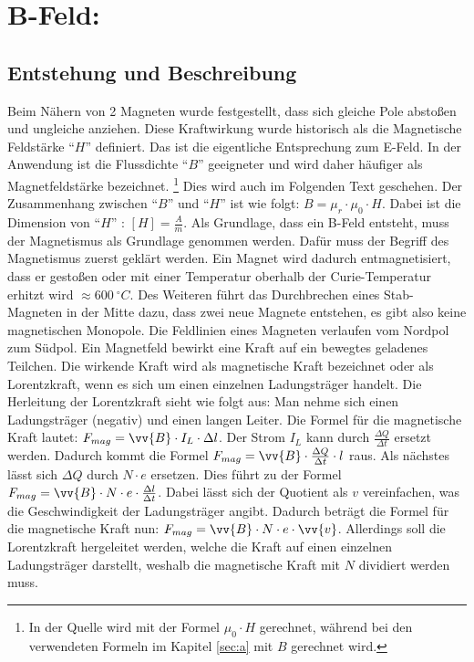 \section{B-Feld:}
\subsection{Entstehung und Beschreibung}
Beim Nähern von 2 Magneten wurde festgestellt, dass sich gleiche Pole abstoßen und ungleiche anziehen.
Diese Kraftwirkung wurde historisch als die Magnetische Feldstärke "`$H$"' definiert.
Das ist die eigentliche Entsprechung zum E-Feld.
In der Anwendung ist die Flussdichte "`$B$"' geeigneter und wird daher häufiger als Magnetfeldstärke bezeichnet. \footnote{In der Quelle \cite{Gente1950} wird mit der Formel $\mu_0 \cdot H$ gerechnet, während bei den verwendeten Formeln im Kapitel \ref{sec:a} mit $B$ gerechnet wird.}
Dies wird auch im Folgenden Text geschehen.
Der Zusammenhang zwischen "`$B$"' und "`$H$"' ist wie folgt: $B = \mu_r \cdot \mu_0 \cdot H$.
Dabei ist die Dimension von "`$H$"' : $[H] = \frac{A}{m}$.
Als Grundlage, dass ein B-Feld entsteht, muss der Magnetismus als Grundlage genommen werden.
Dafür muss der Begriff des Magnetismus zuerst geklärt werden.
Ein Magnet wird dadurch entmagnetisiert, dass er gestoßen oder mit einer Temperatur oberhalb der Curie-Temperatur erhitzt wird $ \approx 600 ~ ^\circ C$.
Des Weiteren führt das Durchbrechen eines Stab-Magneten in der Mitte dazu, dass zwei neue Magnete entstehen, es gibt also keine magnetischen Monopole.
Die Feldlinien eines Magneten verlaufen vom Nordpol zum Südpol.
Ein Magnetfeld bewirkt eine Kraft auf ein bewegtes geladenes Teilchen.
Die wirkende Kraft wird als magnetische Kraft bezeichnet oder als Lorentzkraft, wenn es sich um einen einzelnen Ladungsträger handelt.
Die Herleitung der Lorentzkraft sieht wie folgt aus:
Man nehme sich einen Ladungsträger (negativ) und einen langen Leiter.
Die Formel für die magnetische Kraft lautet: $F_{mag} = \vv{B} \cdot I_L \cdot \Delta l$.
Der Strom $I_L$ kann durch $\frac{\Delta Q}{\Delta t}$ ersetzt werden.
Dadurch kommt die Formel $F_{mag} = \vv{B} \cdot \frac{\Delta Q}{\Delta t} \cdot l$ raus. 
Als nächstes lässt sich $\Delta Q$ durch $N \cdot e$ ersetzen.
Dies führt zu der Formel $F_{mag} =\vv{B} \cdot N \cdot e \cdot \frac{\Delta l}{\Delta t}$.
Dabei lässt sich der Quotient als $v$ vereinfachen, was die Geschwindigkeit der Ladungsträger angibt.
Dadurch beträgt die Formel für die magnetische Kraft nun: $F_{mag} =\vv{B} \cdot N \cdot e \cdot \vv{v} $.
Allerdings soll die Lorentzkraft hergeleitet werden, welche die Kraft auf einen einzelnen Ladungsträger darstellt, weshalb die magnetische Kraft mit $N$ dividiert werden muss.
